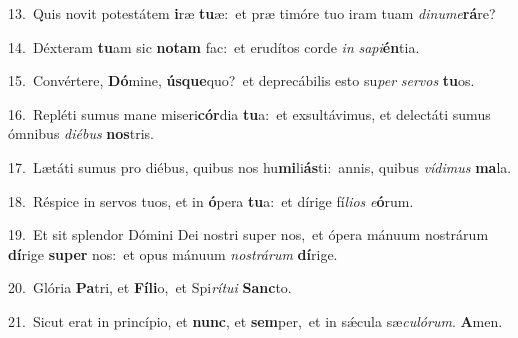 {\numbfont\textcolor{\numbcolor}{13.}}~Quis novit potestátem \textbf{i}\-ræ \textbf{tu}\-æ:~\star et præ timóre tuo iram tuam \textit{di}\-\textit{nu}\textit{me}\textbf{rá}re?\par
{\numbfont\textcolor{\numbcolor}{14.}}~Déxteram \textbf{tu}\-am sic \textbf{no}\-\textbf{tam} fac:~\star et erudítos corde \textit{in} \textit{sa}\-\textit{pi}\textbf{én}tia.\par
{\numbfont\textcolor{\numbcolor}{15.}}~Convértere, \textbf{Dó}\-mine, \textbf{ús}\-\textbf{que}quo?~\star et deprecábilis esto su\textit{per} \textit{ser}\-\textit{vos} \textbf{tu}\-os.\par
{\numbfont\textcolor{\numbcolor}{16.}}~Repléti sumus mane miseri\-\textbf{cór}\-dia \textbf{tu}\-a:~\star et exsultávimus, et delectáti sumus ómnibus \textit{di}\-\textit{é}\textit{bus} \textbf{nos}\-tris.\par
{\numbfont\textcolor{\numbcolor}{17.}}~Lætáti sumus pro diébus, quibus nos hu\-\textbf{mi}\-li\-\textbf{ás}\-ti:~\star annis, quibus \textit{ví}\-\textit{di}\textit{mus} \textbf{ma}\-la.\par
{\numbfont\textcolor{\numbcolor}{18.}}~Réspice in servos tuos, et in \textbf{ó}\-pera \textbf{tu}\-a:~\star et dírige fí\-\textit{li}\-\textit{os} \textit{e}\-\textbf{ó}rum.\par
{\numbfont\textcolor{\numbcolor}{19.}}~Et sit splendor Dómini Dei nostri super nos,~\dagger et ópera mánuum nostrárum \textbf{dí}\-rige \textbf{su}\-\textbf{per} nos:~\star et opus mánuum \textit{nos}\-\textit{trá}\textit{rum} \textbf{dí}\-rige.\par
{\numbfont\textcolor{\numbcolor}{20.}}~Glória \textbf{Pa}\-tri, et \textbf{Fí}\-\textbf{li}o,~\star et Spi\-\textit{rí}\-\textit{tu}\textit{i} \textbf{Sanc}\-to.\par
{\numbfont\textcolor{\numbcolor}{21.}}~Sicut erat in princípio, et \textbf{nunc}\-, et \textbf{sem}\-per,~\star et in sǽcula sæ\-\textit{cu}\-\textit{ló}\textit{rum}. \textbf{A}\-men.\par
